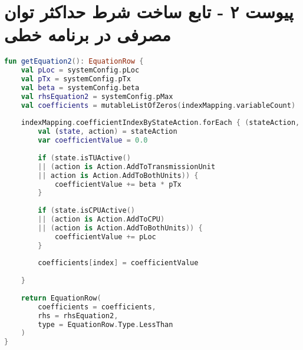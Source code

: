 \chapter*{پیوست ۲ - تابع ساخت شرط حداکثر توان مصرفی در برنامه خطی}

\begin{latin}
	\begin{lstlisting}[language=Kotlin, title=\rl{تابع ساخت شرط حداکثر توان مصرفی}]
fun getEquation2(): EquationRow {
	val pLoc = systemConfig.pLoc
	val pTx = systemConfig.pTx
	val beta = systemConfig.beta
	val rhsEquation2 = systemConfig.pMax
	val coefficients = mutableListOfZeros(indexMapping.variableCount)
	
	indexMapping.coefficientIndexByStateAction.forEach { (stateAction, index) ->
		val (state, action) = stateAction
		var coefficientValue = 0.0
		
		if (state.isTUActive() 
		|| (action is Action.AddToTransmissionUnit 
		|| action is Action.AddToBothUnits)) {
			coefficientValue += beta * pTx
		}
		
		if (state.isCPUActive() 
		|| (action is Action.AddToCPU) 
		|| (action is Action.AddToBothUnits)) {
			coefficientValue += pLoc
		}
		
		coefficients[index] = coefficientValue
		
	}
	
	return EquationRow(
		coefficients = coefficients,
		rhs = rhsEquation2,
		type = EquationRow.Type.LessThan
	)
}
\end{lstlisting}
\end{latin}
\clearpage